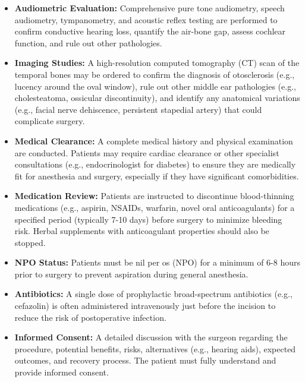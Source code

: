 \begin{itemize}
  \item \textbf{Audiometric Evaluation:} Comprehensive pure tone audiometry, speech audiometry, tympanometry, and acoustic reflex testing are performed to confirm conductive hearing loss, quantify the air-bone gap, assess cochlear function, and rule out other pathologies.
  
  \item \textbf{Imaging Studies:} A high-resolution computed tomography (CT) scan of the temporal bones may be ordered to confirm the diagnosis of otosclerosis (e.g., lucency around the oval window), rule out other middle ear pathologies (e.g., cholesteatoma, ossicular discontinuity), and identify any anatomical variations (e.g., facial nerve dehiscence, persistent stapedial artery) that could complicate surgery.
  
  \item \textbf{Medical Clearance:} A complete medical history and physical examination are conducted. Patients may require cardiac clearance or other specialist consultations (e.g., endocrinologist for diabetes) to ensure they are medically fit for anesthesia and surgery, especially if they have significant comorbidities.
  
  \item \textbf{Medication Review:} Patients are instructed to discontinue blood-thinning medications (e.g., aspirin, NSAIDs, warfarin, novel oral anticoagulants) for a specified period (typically 7-10 days) before surgery to minimize bleeding risk. Herbal supplements with anticoagulant properties should also be stopped.
  
  \item \textbf{NPO Status:} Patients must be nil per os (NPO) for a minimum of 6-8 hours prior to surgery to prevent aspiration during general anesthesia.
  
  \item \textbf{Antibiotics:} A single dose of prophylactic broad-spectrum antibiotics (e.g., cefazolin) is often administered intravenously just before the incision to reduce the risk of postoperative infection.
  
  \item \textbf{Informed Consent:} A detailed discussion with the surgeon regarding the procedure, potential benefits, risks, alternatives (e.g., hearing aids), expected outcomes, and recovery process. The patient must fully understand and provide informed consent.
\end{itemize}

